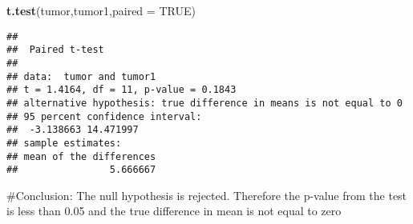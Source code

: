 \documentclass[]{article}
\newenvironment{Shaded}{\begin{snugshade}}{\end{snugshade}}
\newcommand{\DataTypeTok}[1]{\textcolor[rgb]{0.13,0.29,0.53}{#1}}
\newcommand{\KeywordTok}[1]{\textcolor[rgb]{0.13,0.29,0.53}{\textbf{#1}}}
\newcommand{\NormalTok}[1]{#1}
\newcommand{\OtherTok}[1]{\textcolor[rgb]{0.56,0.35,0.01}{#1}}
\begin{document}
\begin{Shaded}
\begin{Highlighting}[]
\KeywordTok{t.test}\NormalTok{(tumor,tumor1,}\DataTypeTok{paired =} \OtherTok{TRUE}\NormalTok{)}
\end{Highlighting}
\end{Shaded}

\begin{verbatim}
## 
##  Paired t-test
## 
## data:  tumor and tumor1
## t = 1.4164, df = 11, p-value = 0.1843
## alternative hypothesis: true difference in means is not equal to 0
## 95 percent confidence interval:
##  -3.138663 14.471997
## sample estimates:
## mean of the differences 
##                5.666667
\end{verbatim}

\#Conclusion: The null hypothesis is rejected. Therefore the p-value
from the test is less than 0.05 and the true difference in mean is not
equal to zero
\end{document}
